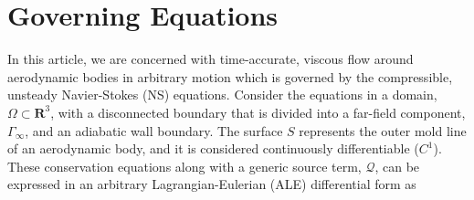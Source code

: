 \section{Governing Equations}
\label{sec:govEq}

In this article, we are concerned with time-accurate, viscous flow around aerodynamic bodies in arbitrary motion which is governed by the compressible, unsteady Navier-Stokes (NS) equations. Consider the equations in a domain, $\Omega \subset \mathbf{R}^3$, with a disconnected boundary that is divided into a far-field component, $\Gamma_\infty$, and an adiabatic wall boundary. The surface $S$ represents the outer mold line of an aerodynamic body, and it is considered continuously differentiable ($C^1$). These conservation equations along with a generic source term, $\mathcal{Q} $, can be expressed in an arbitrary Lagrangian-Eulerian (ALE) differential form as


